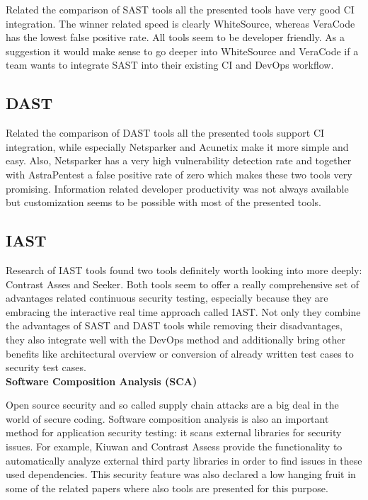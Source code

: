 \documentclass[conference]{IEEEtran}
\begin{document}
Related the comparison of SAST tools all the presented tools have very good CI integration. The winner related speed is clearly WhiteSource, whereas VeraCode has the lowest false positive rate. All tools seem to be developer friendly. As a suggestion it would make sense to go deeper into WhiteSource and VeraCode if a team wants to integrate SAST into their existing CI and DevOps workflow.

\subsection{DAST}

Related the comparison of DAST tools all the presented tools support CI integration, while especially Netsparker and Acunetix make it more simple and easy. Also, Netsparker has a very high vulnerability detection rate and together with AstraPentest a false positive rate of zero which makes these two tools very promising. Information related developer productivity was not always available but customization seems to be possible with most of the presented tools.

\subsection{IAST}

Research of IAST tools found two tools definitely worth looking into more deeply: Contrast Asses and Seeker. Both tools  seem to offer a really comprehensive set of advantages related continuous security testing, especially because they are embracing the interactive real time approach called IAST. Not only they combine the advantages of SAST and DAST tools while removing their disadvantages, they also integrate well with the DevOps method and additionally bring other benefits like architectural overview or conversion of already written test cases to security test cases. \\

\textbf{Software Composition Analysis (SCA)}

Open source security and so called supply chain attacks are a big deal in the world of secure coding. Software composition analysis is also an important method for application security testing: it scans external libraries for security issues. For example, Kiuwan and Contrast Assess provide the functionality to automatically analyze external third party libraries in order to find issues in these used dependencies. This security feature was also declared a low hanging fruit in some of the related papers where also tools are presented for this purpose.\\
\end{document}
